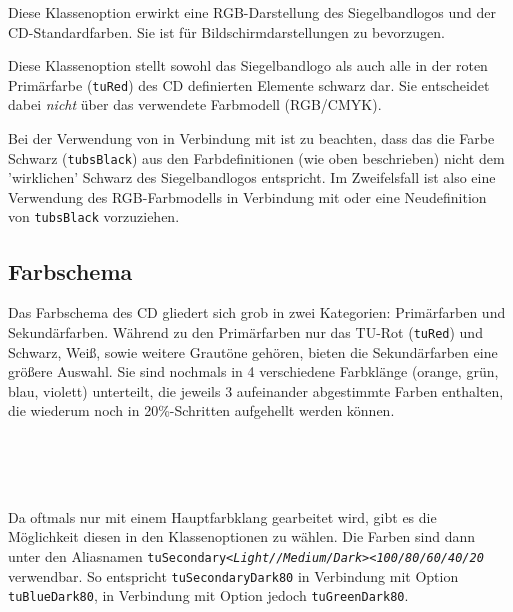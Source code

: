 \begin{Declaration}
\end{Declaration}

Diese Klassenoption erwirkt eine RGB-Darstellung des Siegelbandlogos und der
CD-Standardfarben. Sie ist für Bildschirmdarstellungen zu bevorzugen.

\begin{Declaration}
\end{Declaration}

Diese Klassenoption stellt sowohl das Siegelbandlogo als auch alle in der
roten Primärfarbe (\texttt{tuRed}) des CD definierten Elemente schwarz dar.
Sie entscheidet dabei \emph{nicht} über das verwendete Farbmodell (RGB/CMYK).
\begin{important}
  Bei der Verwendung von  in Verbindung mit 
  ist zu beachten, dass das die Farbe Schwarz (\texttt{tubsBlack})
  aus den Farbdefinitionen (wie oben beschrieben) nicht dem 'wirklichen' Schwarz
  des Siegelbandlogos entspricht.
  Im Zweifelsfall ist also eine Verwendung des RGB-Farbmodells in Verbindung
  mit  oder eine Neudefinition von \texttt{tubsBlack} vorzuziehen.
\end{important}

\subsection{Farbschema}

Das Farbschema des CD gliedert sich grob in zwei Kategorien: Primärfarben
und Sekundärfarben. Während zu den Primärfarben nur das TU-Rot (\texttt{tuRed})
und Schwarz, Weiß, sowie weitere Grautöne gehören, bieten die Sekundärfarben
eine größere Auswahl. Sie sind nochmals in 4 verschiedene Farbklänge
(orange, grün, blau, violett) unterteilt, die jeweils 3 aufeinander
abgestimmte Farben enthalten, die wiederum noch in 20\%-Schritten aufgehellt
werden können.

\begin{Declaration}
  \\
  \\
  \\
\end{Declaration}

\begin{sloppypar}
Da oftmals nur mit einem Hauptfarbklang gearbeitet wird, gibt es die Möglichkeit
diesen in den Klassenoptionen zu wählen. Die Farben sind dann unter den
Aliasnamen
\texttt{tuSecondary\textit{<Light//Medium/Dark>}\textit{<100/80/60/40/20}}
verwendbar.
So entspricht \texttt{tuSecondaryDark80} in Verbindung mit Option
 \texttt{tuBlueDark80}, in Verbindung mit Option 
jedoch \texttt{tuGreenDark80}.
\end{sloppypar}

